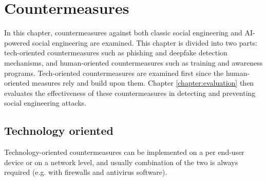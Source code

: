


\chapter{Countermeasures\label{chapter:countermeasures}}

\begin{comment}

Guides:
    - 

TODO:
    [ ] 

What to cover:
    - AI monitoring content and informing the user if something they are about to share could be used against them or their organization?
    - AI generated training content suited to the personality of the user
    - Policies and EU etc regulations about the development of AI tech
    
Literature:
    - 

\end{comment}

In this chapter, countermeasures against both classic social engineering and AI-powered social engineering are examined. This chapter is divided into two parts: tech-oriented countermeasures such as phishing and deepfake detection mechanisms, and human-oriented countermeasures such as training and awareness programs. Tech-oriented countermeasures are examined first since the human-oriented measures rely and build upon them. Chapter \ref{chapter:evaluation} then evaluates the effectiveness of these countermeasures in detecting and preventing social engineering attacks.













\section{Technology oriented}

\begin{comment}    
    - Deepfake content detection
    - Spear phishing detection
\end{comment}

Technology-oriented countermeasures can be implemented on a per end-user device or on a network level, and usually combination of the two is always required (e.g. with firewalls and antivirus software).

